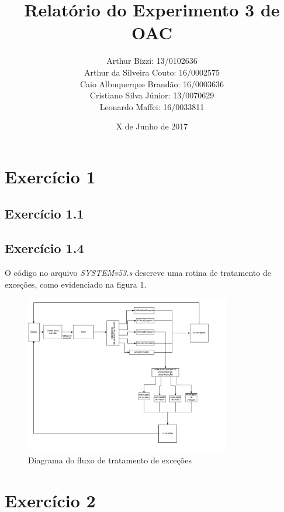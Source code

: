 \documentclass[12pt, a4paper, twoside]{article}
\begin{document}
\title{Relatório do Experimento 3 de OAC}
\author{
Arthur Bizzi: 13/0102636 \\
Arthur da Silveira Couto: 16/0002575 \\
Caio Albuquerque Brandão: 16/0003636 \\
Cristiano Silva Júnior: 13/0070629 \\
Leonardo Maffei: 16/0033811 \\}
\date{X de Junho de 2017}
\maketitle

\section{Exercício 1}

\subsection{Exercício 1.1}

\subsection{Exercício 1.4}

O código no arquivo \textit{SYSTEMv53.s} descreve uma rotina de tratamento de exceções, como evidenciado na figura 1.

\begin{figure}
    \centering
    \includegraphics[width=0.8\textwidth]{./figs/f1-4.png}
    \caption{Diagrama do fluxo de tratamento de exceções}
\end{figure}

\section{Exercício 2}

\end{document}

